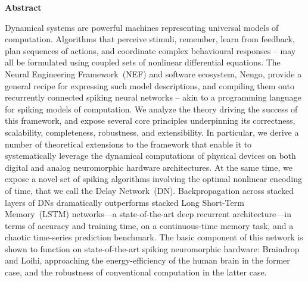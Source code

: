 {}
\begin{center}\textbf{Abstract}\end{center}

Dynamical systems are powerful machines representing universal models of computation.
Algorithms that perceive stimuli, remember, learn from feedback, plan sequences of actions, and coordinate complex behavioural responses -- may all be formulated using coupled sets of nonlinear differential equations.
The Neural Engineering Framework~(NEF) and software ecosystem, Nengo, provide a general recipe for expressing such model descriptions, and compiling them onto recurrently connected spiking neural networks -- akin to a programming language for spiking models of computation.
We analyze the theory driving the success of this framework, and expose several core principles underpinning its correctness, scalability, completeness, robustness, and extensibility.
In particular, we derive a number of theoretical extensions to the framework that enable it to systematically leverage the dynamical computations of physical devices on both digital and analog neuromorphic hardware architectures.
At the same time, we expose a novel set of spiking algorithms involving the optimal nonlinear encoding of time, that we call the Delay Network~(DN).
Backpropagation across stacked layers of DNs dramatically outperforms stacked Long Short-Term Memory~(LSTM) networks---a state-of-the-art deep recurrent architecture---in terms of accuracy and training time, on a continuous-time memory task, and a chaotic time-series prediction benchmark.
The basic component of this network is shown to function on state-of-the-art spiking neuromorphic hardware: Braindrop and Loihi, approaching the energy-efficiency of the human brain in the former case, and the robustness of conventional computation in the latter case.

\cleardoublepage
